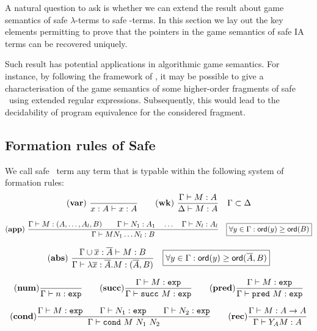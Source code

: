 A natural question to ask is whether we can extend the result about
game semantics of safe $\lambda$-terms to safe \ialgol-terms. In
this section we lay out the key elements permitting to prove that
the pointers in the game semantics of safe IA terms can be recovered
uniquely.

Such result has potential applications in algorithmic game semantics.
For instance, by following the framework of \cite{ghicamccusker00},
it may be possible to give a characterisation of the game semantics
of some higher-order fragments of safe \ialgol\ using extended
regular expressions. Subsequently, this would lead to the
decidability of program equivalence for the considered fragment.


\subsection{Formation rules of Safe \ialgol}
We call safe \ialgol\ term any term that is typable within the
following system of formation rules:
$$ \mathbf{(var)} \   \frac{\displaystyle }{x : A\vdash x : A}
\qquad  \mathbf{(wk)} \   \frac{\displaystyle \Gamma \vdash M : A}{\Delta \vdash
M : A} \quad  \Gamma \subset \Delta$$

$$ \mathbf{(app)} \  \frac{\displaystyle \Gamma \vdash M : (A,\ldots,A_l,B)
                                        \qquad \Gamma \vdash N_1 : A_1
                                        \quad \ldots \quad \Gamma \vdash N_l : A_l  }{\Gamma  \vdash M N_1 \ldots N_l : B}
                                    \quad
\mbox{\fbox{$\forall y \in \Gamma : {\sf ord}(y) \geq {\sf ord}(B)$}}$$

$$ \mathbf{(abs)} \   \frac{\displaystyle \Gamma \cup \overline{x} : \overline{A} \vdash M : B}{\Gamma  \vdash \lambda \overline{x} : \overline{A} . M : (\overline{A},B)} \quad
\mbox{\fbox{$\forall y \in \Gamma : {\sf ord}(y) \geq {\sf ord}(\overline{A},B)$}}$$

$$ \mathbf{(num)} \frac{\displaystyle }{\Gamma \vdash n :\texttt{exp}}
\qquad \mathbf{(succ)} \frac{\displaystyle \Gamma \vdash M:\texttt{exp} }{\Gamma
\vdash \texttt{succ}\ M:\texttt{exp}} \qquad \mathbf{(pred)}
\frac{\displaystyle \Gamma \vdash M:\texttt{exp} }{\Gamma \vdash \texttt{pred}\
M:\texttt{exp}}$$

$$
\mathbf{(cond)} \frac{\displaystyle \Gamma \vdash M : \texttt{exp} \qquad \Gamma
\vdash N_1 : \texttt{exp} \qquad \Gamma \vdash N_2 : \texttt{exp}
}{\Gamma \vdash \texttt{cond}\ M\ N_1\ N_2} \qquad  \mathbf{(rec)}
\frac{\displaystyle \Gamma \vdash M : A\rightarrow A }{ \Gamma \vdash Y_A M :
A}$$

